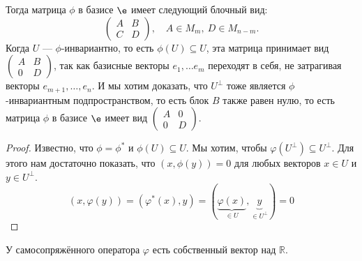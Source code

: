 Тогда матрица $\phi$ в базисе $\e$ имеет следующий блочный вид: 
$$
\begin{pmatrix}A & B \\ C & D\end{pmatrix}, \quad  A \in M_m,\ D \in M_{n-m}.
$$	 
Когда $U$ --- $\phi$-инвариантно, то есть $\phi(U) \subseteq U$, эта матрица принимает вид $\begin{pmatrix}A & B \\ 0 & D\end{pmatrix}$, так как базисные векторы $e_1,\ldots e_m$ переходят в себя, не затрагивая векторы $e_{m+1}, \ldots, e_n$. И мы хотим доказать, что $U^\perp$ тоже является $\phi$-инвариантным подпространством, то есть блок $B$ также равен нулю, то есть матрица $\phi$ в базисе $\e$ имеет вид $\begin{pmatrix}A & 0 \\ 0 & D\end{pmatrix}$.

\begin{proof}	 
	Известно, что $\phi = \phi^*$ и $\phi(U) \subseteq U$.
	Мы хотим, чтобы $\varphi(U^\perp) \subseteq U^\perp$. Для этого нам достаточно показать, что $(x, \phi(y)) = 0$ для любых векторов $x \in U$ и $y \in U^\perp$. 
	\[
		(x,\varphi(y)) = (\varphi^*(x), y) = (\underbrace{\varphi(x)}_{\in U}, \underbrace{y}_{\in U^\perp}) = 0
	\]
\end{proof}

\begin{Suggestion}
	У самосопряжённого оператора $\varphi$ есть собственный вектор над $\mathbb{R}$. 
\end{Suggestion}

